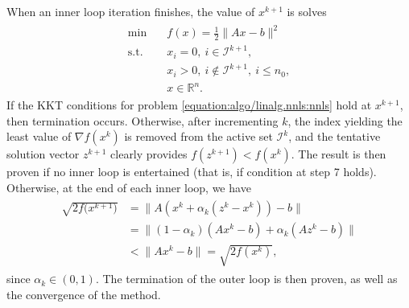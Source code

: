 \documentclass[letterpaper,10pt,english]{sphinxmanual}
\newcommand{\norm}[2][]{#1\lVert#2#1\rVert}
\def\R{\ensuremath{\mathds{R}}}
\begin{document}
\sphinxAtStartPar
When an inner loop iteration finishes, the value of \(x^{k + 1}\) is solves
\begin{equation*}
\begin{split}\begin{array}{ll}
    \min        & \quad f(x) = \frac{1}{2} \norm{Ax - b}^2\\
    \text{s.t.} & \quad x_i = 0, ~ i \in \mathcal{I}^{k + 1},\\
                & \quad x_i > 0, ~ i \notin \mathcal{I}^{k + 1}, ~ i \le n_0,\\
                & \quad x \in \R^n.
\end{array}\end{split}
\end{equation*}
\sphinxAtStartPar
If the KKT conditions for problem \eqref{equation:algo/linalg.nnls:nnls} hold at \(x^{k + 1}\), then
termination occurs. Otherwise, after incrementing \(k\), the index yielding
the least value of \(\nabla f(x^k)\) is removed from the active set
\(\mathcal{I}^k\), and the tentative solution vector \(z^{k + 1}\)
clearly provides \(f(z^{k + 1}) < f(x^k)\). The result is then proven if no
inner loop is entertained (that is, if condition at step 7 holds). Otherwise,
at the end of each inner loop, we have
\begin{equation*}
\begin{split}\begin{aligned}
    \sqrt{2 f\big(x^{k + 1}\big)}
        &= \norm[\big]{A (x^k + \alpha_k (z^k - x^k)) - b}\\
        &= \norm[\big]{(1 - \alpha_k) (Ax^k - b) + \alpha_k (Az^k - b)}\\
        &< \norm{Ax^k - b} = \sqrt{2 f(x^k)},
\end{aligned}\end{split}
\end{equation*}
\sphinxAtStartPar
since \(\alpha_k \in (0, 1)\). The termination of the outer loop is then
proven, as well as the convergence of the method.



\renewcommand{\indexname}{Index}
\printindex
\end{document}
